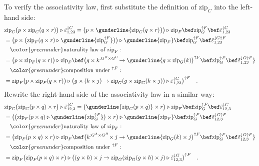 To verify the associativity law, first substitute the definition of
$\text{zip}_{C}$ into the left-hand side:\\
\begin{align*}
 & \text{zip}_{C}\big(p\times\text{zip}_{C}(q\times r)\big)\triangleright\tilde{\varepsilon}_{1,23}^{\downarrow C}=\big(p\times\gunderline{\text{zip}_{C}(q\times r)}\big)\triangleright\text{zip}_{F}\bef\text{zip}_{G}^{\uparrow F}\bef\tilde{\varepsilon}_{1,23}^{\downarrow C}\\
 & =\big(p\times\big(\text{zip}_{F}(q\times r)\triangleright\gunderline{\text{zip}_{G}^{\uparrow F}}\big)\big)\triangleright\gunderline{\text{zip}_{F}}\bef\text{zip}_{G}^{\uparrow F}\bef\tilde{\varepsilon}_{1,23}^{\downarrow G\uparrow F}\\
 & \quad{\color{greenunder}\text{naturality law of }\text{zip}_{F}:}\quad\\
 & =\big(p\times\text{zip}_{F}(q\times r)\big)\triangleright\text{zip}_{F}\bef\big(g\times k^{:G^{B}\times G^{C}}\!\rightarrow\gunderline{g\times\text{zip}_{G}(k)\big)^{\uparrow F}\bef\text{zip}_{G}^{\uparrow F}\bef\tilde{\varepsilon}_{1,23}^{\downarrow G\uparrow F}}\\
 & \quad{\color{greenunder}\text{composition under }^{\uparrow F}:}\quad\\
 & =\text{zip}_{F}\big(p\times\text{zip}_{F}(q\times r)\big)\triangleright\big(g\times(h\times j)\rightarrow\text{zip}_{G}(g\times\text{zip}_{G}(h\times j))\triangleright\tilde{\varepsilon}_{1,23}^{\downarrow G}\big)^{\uparrow F}\quad.
\end{align*}
Rewrite the right-hand side of the associativity law in a similar
way:
\begin{align*}
 & \text{zip}_{C}\big(\text{zip}_{C}(p\times q)\times r\big)\triangleright\tilde{\varepsilon}_{12,3}^{\downarrow C}=\big(\gunderline{\text{zip}_{C}(p\times q)}\times r\big)\triangleright\text{zip}_{F}\bef\text{zip}_{G}^{\uparrow F}\bef\tilde{\varepsilon}_{12,3}^{\downarrow C}\\
 & =\big(\big(\text{zip}_{F}(p\times q)\triangleright\gunderline{\text{zip}_{G}^{\uparrow F}}\big)\times r\big)\triangleright\gunderline{\text{zip}_{F}}\bef\text{zip}_{G}^{\uparrow F}\bef\tilde{\varepsilon}_{12,3}^{\downarrow G\uparrow F}\\
 & \quad{\color{greenunder}\text{naturality law of }\text{zip}_{F}:}\quad\\
 & =\big(\text{zip}_{F}(p\times q)\times r\big)\triangleright\text{zip}_{F}\bef\big(k^{:G^{A}\times G^{B}}\!\times j\rightarrow\gunderline{\text{zip}_{G}(k)\times j\big)^{\uparrow F}\bef\text{zip}_{G}^{\uparrow F}\bef\tilde{\varepsilon}_{12,3}^{\downarrow G\uparrow F}}\\
 & \quad{\color{greenunder}\text{composition under }^{\uparrow F}:}\quad\\
 & =\text{zip}_{F}\big(\text{zip}_{F}(p\times q)\times r\big)\triangleright\big((g\times h)\times j\rightarrow\text{zip}_{G}(\text{zip}_{G}(g\times h)\times j)\triangleright\tilde{\varepsilon}_{12,3}^{\downarrow G}\big)^{\uparrow F}\quad.
\end{align*}
